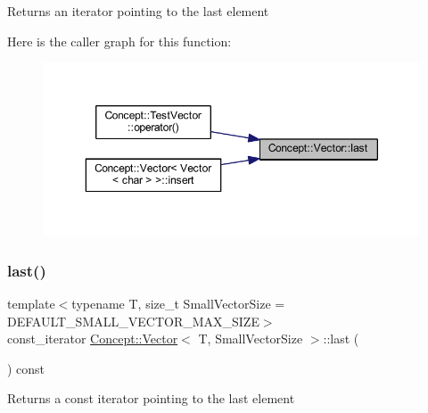 \begin{DoxyReturn}{Returns}
an iterator pointing to the last element 
\end{DoxyReturn}
Here is the caller graph for this function\+:\nopagebreak
\begin{figure}[H]
\begin{center}
\leavevmode
\includegraphics[width=350pt]{class_concept_1_1_vector_a27a72907afb7223fe8a4f892000c8322_icgraph}
\end{center}
\end{figure}
\mbox{\label{class_concept_1_1_vector_a6e0abe20c6601aafaa79581514243181}} 
\subsubsection{\texorpdfstring{last()}{last()}\hspace{0.1cm}{\footnotesize\ttfamily [2/2]}}
{\footnotesize\ttfamily template$<$typename T, size\+\_\+t Small\+Vector\+Size = D\+E\+F\+A\+U\+L\+T\+\_\+\+S\+M\+A\+L\+L\+\_\+\+V\+E\+C\+T\+O\+R\+\_\+\+M\+A\+X\+\_\+\+S\+I\+ZE$>$ \\
const\+\_\+iterator \mbox{\hyperlink{class_concept_1_1_vector}{Concept\+::\+Vector}}$<$ T, Small\+Vector\+Size $>$\+::last (\begin{DoxyParamCaption}{ }\end{DoxyParamCaption}) const\hspace{0.3cm}{\ttfamily [inline]}}

\begin{DoxyReturn}{Returns}
a const iterator pointing to the last element 
\end{DoxyReturn}
\mbox{\label{class_concept_1_1_vector_a53641dbb6e511072424b38ca2ffdeeda}} 
